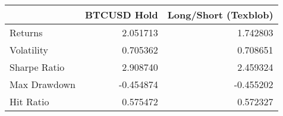 \begin{tabular}{lrr}
\toprule
{} &  BTCUSD Hold &  Long/Short (Texblob) \\
\midrule
Returns      &     2.051713 &              1.742803 \\
Volatility   &     0.705362 &              0.708651 \\
Sharpe Ratio &     2.908740 &              2.459324 \\
Max Drawdown &    -0.454874 &             -0.455202 \\
Hit Ratio    &     0.575472 &              0.572327 \\
\bottomrule
\end{tabular}
